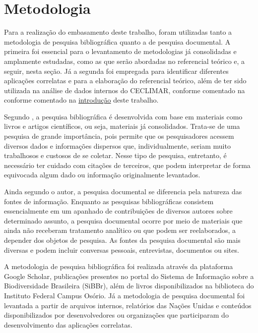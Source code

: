 \chapter{Metodologia}\label{metodologia}
Para a realização do embasamento deste trabalho, foram utilizadas tanto a metodologia de pesquisa bibliográfica quanto a de pesquisa documental. A primeira foi essencial para o levantamento de metodologias já consolidadas e amplamente estudadas, como as que serão abordadas no referencial teórico e, a seguir, nesta seção. Já a segunda foi empregada para identificar diferentes aplicações correlatas e para a elaboração do referencial teórico, além de ter sido utilizada na análise de dados internos do CECLIMAR, conforme comentado na conforme comentado na \hyperref[chapter:intro]{introdução} deste trabalho.

Segundo , a pesquisa bibliográfica é desenvolvida com base em materiais como livros e artigos científicos, ou seja, materiais já consolidados. Trata-se de uma pesquisa de grande importância, pois permite que os pesquisadores acessem diversos dados e informações dispersos que, individualmente, seriam muito trabalhosos e custosos de se coletar. Nesse tipo de pesquisa, entretanto, é necessário ter cuidado com citações de terceiros, que podem interpretar de forma equivocada algum dado ou informação originalmente levantados.

Ainda segundo o autor, a pesquisa documental se diferencia pela natureza das fontes de informação. Enquanto as pesquisas bibliográficas consistem essencialmente em um apanhado de contribuições de diversos autores sobre determinado assunto, a pesquisa documental ocorre por meio de materiais que ainda não receberam tratamento analítico ou que podem ser reelaborados, a depender dos objetos de pesquisa. As fontes da pesquisa documental são mais diversas e podem incluir conversas pessoais, entrevistas, documentos ou sites.

A metodologia de pesquisa bibliográfica foi realizada através da plataforma Google Scholar, publicações presentes no portal do Sistema de Informação sobre a Biodiversidade Brasileira (SiBBr), além de livros disponibilizados na biblioteca do Instituto Federal Campus Osório. Já a metodologia de pesquisa documental foi levantada a partir de arquivos internos, relatórios das Nações Unidas e conteúdos disponibilizados por desenvolvedores ou organizações que participaram do desenvolvimento das aplicações correlatas.

